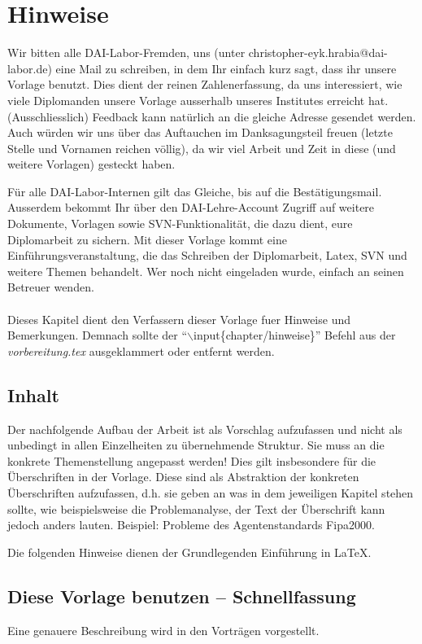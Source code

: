 \chapter*{Hinweise}
Wir bitten alle DAI-Labor-Fremden, uns (unter christopher-eyk.hrabia@dai-labor.de) eine Mail zu schreiben, in dem Ihr einfach kurz sagt, dass ihr unsere Vorlage benutzt. Dies dient der reinen Zahlenerfassung, da uns interessiert, wie viele Diplomanden unsere Vorlage ausserhalb unseres Institutes erreicht hat. (Ausschliesslich) Feedback kann natürlich an die gleiche Adresse gesendet werden. Auch würden wir uns über das Auftauchen im Danksagungsteil freuen (letzte Stelle und Vornamen reichen völlig), da wir viel Arbeit und Zeit in diese (und weitere Vorlagen) gesteckt haben.

Für alle DAI-Labor-Internen gilt das Gleiche, bis auf die Bestätigungsmail. Ausserdem bekommt Ihr über den DAI-Lehre-Account Zugriff auf weitere Dokumente, Vorlagen sowie SVN-Funktionalität, die dazu dient, eure Diplomarbeit zu sichern. Mit dieser Vorlage kommt eine Einführungsveranstaltung, die das Schreiben der Diplomarbeit, Latex, SVN und weitere Themen behandelt. Wer noch nicht eingeladen wurde, einfach an seinen Betreuer wenden.\\\\

\noindent Dieses Kapitel dient den Verfassern dieser Vorlage fuer Hinweise und Bemerkungen. Demnach sollte der ``$\backslash$input\{chapter{\slash}hinweise\}'' Befehl aus der {\em vorbereitung.tex} ausgeklammert oder entfernt werden.
\section{Inhalt}
Der nachfolgende Aufbau der Arbeit ist als Vorschlag aufzufassen und nicht als unbedingt in allen Einzelheiten zu übernehmende Struktur. Sie muss an die konkrete Themenstellung angepasst werden! Dies gilt insbesondere für die Überschriften in der Vorlage. Diese sind als Abstraktion der konkreten Überschriften aufzufassen, d.h. sie geben an was in dem jeweiligen Kapitel stehen sollte, wie beispielsweise die Problemanalyse, der Text der Überschrift kann jedoch anders lauten. Beispiel: Probleme des Agentenstandards Fipa2000.

Die folgenden Hinweise dienen der Grundlegenden Einführung in \LaTeX.

\section{Diese Vorlage benutzen -- Schnellfassung}
Eine genauere Beschreibung wird in den Vorträgen vorgestellt.\\

